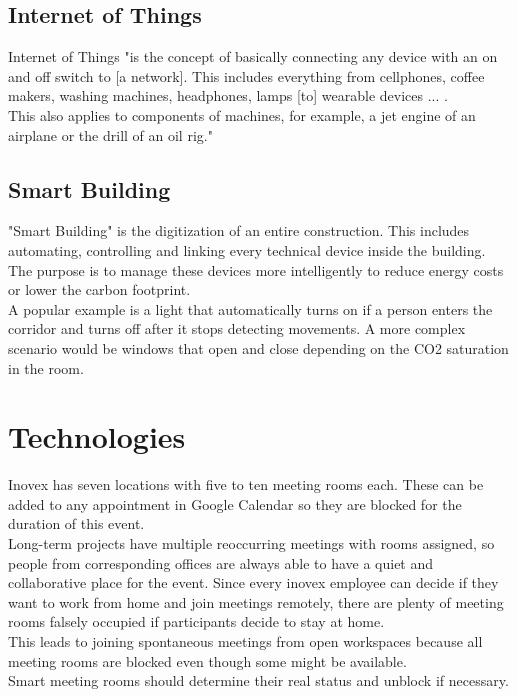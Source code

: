 \subsection{Internet of Things}
Internet of Things "is the concept of basically connecting any device with an on and off switch to [a network]. This includes everything from cellphones, coffee makers, washing machines, headphones, lamps [to] wearable devices ... .\\
This also applies to components of machines, for example, a jet engine of an airplane or the drill of an oil rig."\cite{forbes-iot}

\subsection{Smart Building}
"Smart Building" is the digitization of an entire construction. This includes automating, controlling and linking every technical device inside the building. The purpose is to manage these devices more intelligently to reduce energy costs or lower the carbon footprint.\cite{kiwi-sb}\\
A popular example is a light that automatically turns on if a person enters the corridor and turns off after it stops detecting movements. A more complex scenario would be windows that open and close depending on the CO2 saturation in the room.
\newpage

\section{Technologies}
Inovex has seven locations with five to ten meeting rooms each. These can be added to any appointment in Google Calendar so they are blocked for the duration of this event.\\
Long-term projects have multiple reoccurring meetings with rooms assigned, so people from corresponding offices are always able to have a quiet and collaborative place for the event. Since every inovex employee can decide if they want to work from home and join meetings remotely, there are plenty of meeting rooms falsely occupied if participants decide to stay at home.\\
This leads to joining spontaneous meetings from open workspaces because all meeting rooms are blocked even though some might be available.\\
Smart meeting rooms should determine their real status and unblock if necessary.

